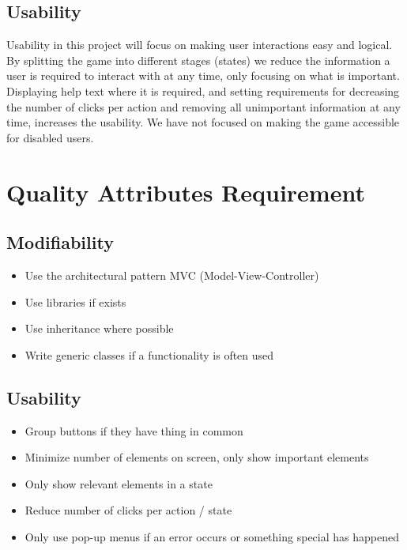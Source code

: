			\subsection{Usability}
			Usability in this project will focus on making user interactions easy and logical. By splitting the game into different stages (states) we reduce the information a user is required to interact with at any time, only focusing on what is important. Displaying help text where it is required, and setting requirements for decreasing the number of clicks per action and removing all unimportant information at any time, increases the usability. We have not focused on making the game accessible for disabled users.

	\section{Quality Attributes Requirement}
		\subsection{Modifiability}
		\begin{itemize}
			\item Use the architectural pattern MVC (Model-View-Controller)
			\item Use libraries if exists
			\item Use inheritance where possible
			\item Write generic classes if a functionality is often used
			\end{itemize}
			
		\subsection{Usability}
		\begin{itemize}
			\item Group buttons if they have thing in common
			\item Minimize number of elements on screen, only show important elements
			\item Only show relevant elements in a state
			\item Reduce number of clicks per action / state
			\item Only use pop-up menus if an error occurs or something special has happened
		\end{itemize}

